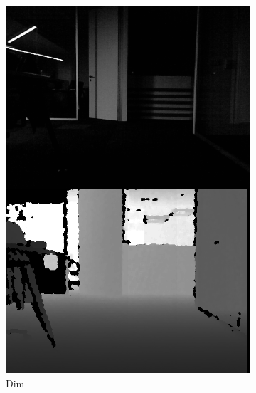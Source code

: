 \documentclass[]{spie}  %
\begin{document}
\begin{figure}
\begin{subfigure}[b]{0.27\textwidth}
        \includegraphics[trim = 0mm 0mm 0mm 0mm, clip, width=\textwidth]{figures/dataset_dim.png}    
        \caption{Dim}
        \label{subfig:dataset_dim}
        \end{subfigure}
         ~ 
        \begin{subfigure}[b]{0.27\textwidth}
        \centering

\end{subfigure}
\end{figure}
\end{document}
